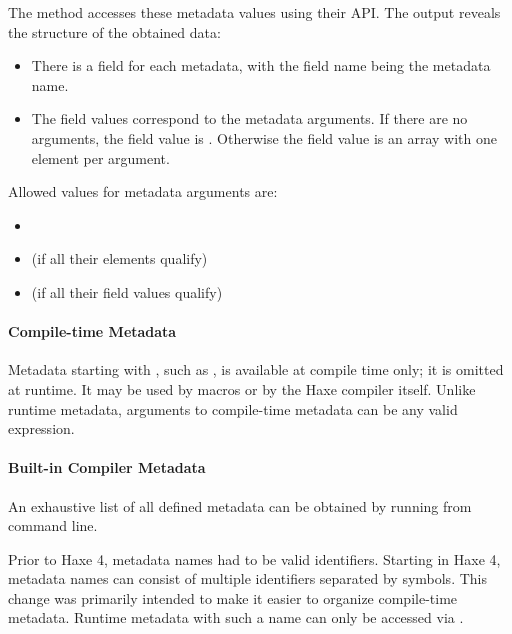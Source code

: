 The  method accesses these metadata values using their API. The output reveals the structure of the obtained data:

\begin{itemize}
	\item There is a field for each metadata, with the field name being the metadata name.
	\item The field values correspond to the metadata arguments. If there are no arguments, the field value is . Otherwise the field value is an array with one element per argument.
\end{itemize}

Allowed values for metadata arguments are:

\begin{itemize}
	\item {}
	\item {} (if all their elements qualify)
	\item {} (if all their field values qualify)
\end{itemize}

\paragraph{Compile-time Metadata}

Metadata starting with \expr{:}, such as , is available at compile time only; it is omitted at runtime. It may be used by macros or by the Haxe compiler itself. Unlike runtime metadata, arguments to compile-time metadata can be any valid expression.

\paragraph{Built-in Compiler Metadata}
An exhaustive list of all defined metadata can be obtained by running  from command line.


Prior to Haxe 4, metadata names had to be valid identifiers. Starting in Haxe 4, metadata names can consist of multiple identifiers separated by  symbols. This change was primarily intended to make it easier to organize compile-time metadata. Runtime metadata with such a name can only be accessed via .


